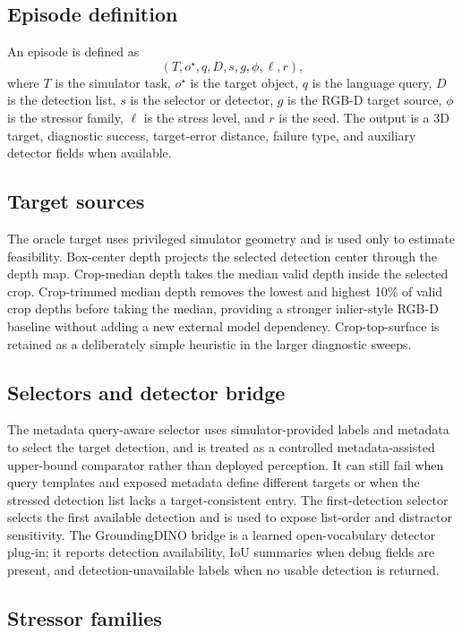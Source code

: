 \subsection{Episode definition}

An episode is defined as
\[
(T, o^\star, q, D, s, g, \phi, \ell, r),
\]
where \(T\) is the simulator task, \(o^\star\) is the target object, \(q\) is the language query, \(D\) is the detection list, \(s\) is the selector or detector, \(g\) is the RGB-D target source, \(\phi\) is the stressor family, \(\ell\) is the stress level, and \(r\) is the seed. The output is a 3D target, diagnostic success, target-error distance, failure type, and auxiliary detector fields when available.

\subsection{Target sources}

The oracle target uses privileged simulator geometry and is used only to estimate feasibility. Box-center depth projects the selected detection center through the depth map. Crop-median depth takes the median valid depth inside the selected crop. Crop-trimmed median depth removes the lowest and highest 10\% of valid crop depths before taking the median, providing a stronger inlier-style RGB-D baseline without adding a new external model dependency. Crop-top-surface is retained as a deliberately simple heuristic in the larger diagnostic sweeps.

\subsection{Selectors and detector bridge}

The metadata query-aware selector uses simulator-provided labels and metadata to select the target detection, and is treated as a controlled metadata-assisted upper-bound comparator rather than deployed perception. It can still fail when query templates and exposed metadata define different targets or when the stressed detection list lacks a target-consistent entry. The first-detection selector selects the first available detection and is used to expose list-order and distractor sensitivity. The GroundingDINO bridge is a learned open-vocabulary detector plug-in; it reports detection availability, IoU summaries when debug fields are present, and detection-unavailable labels when no usable detection is returned.

\subsection{Stressor families}

